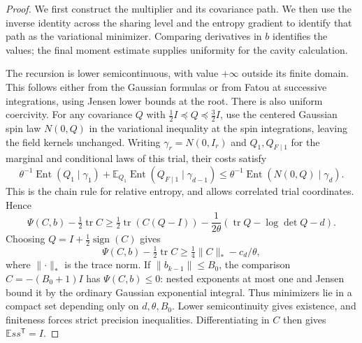 \documentclass[11pt]{article}
\numberwithin{equation}{section}
\theoremstyle{definition}
\newcommand{\E}{\mathbb E}
\newcommand{\tr}{\operatorname{tr}}
\newcommand{\norm}[1]{\lVert #1\rVert}
\begin{document}
\begin{proof}
We first construct the multiplier and its covariance path. We then use the inverse identity across the sharing level and the entropy gradient to identify that path as the variational minimizer. Comparing derivatives in $b$ identifies the values; the final moment estimate supplies uniformity for the cavity calculation.

The recursion is lower semicontinuous, with value $+\infty$ outside its finite domain. This follows either from the Gaussian formulas or from Fatou at successive integrations, using Jensen lower bounds at the root. There is also uniform coercivity. For any covariance $Q$ with $\frac12I\preceq Q\preceq\frac32I$, use the centered Gaussian spin law $N(0,Q)$ in the variational inequality at the spin integrations, leaving the field kernels unchanged. Writing $\gamma_r=N(0,I_r)$ and $Q_1,Q_{F\mid1}$ for the marginal and conditional laws of this trial, their costs satisfy
\[
\theta^{-1}\operatorname{Ent}(Q_1\mid\gamma_1)
+\E_{Q_1}\operatorname{Ent}(Q_{F\mid1}\mid\gamma_{d-1})
\le\theta^{-1}\operatorname{Ent}(N(0,Q)\mid\gamma_d).
\]
This is the chain rule for relative entropy, and allows correlated trial coordinates. Hence
\[
\Psi(C,b)-\tfrac12\tr C
\ge\tfrac12\tr(C(Q-I))-
\frac1{2\theta}(\tr Q-\log\det Q-d).
\]
Choosing $Q=I+\frac12\operatorname{sign}(C)$ gives
\begin{equation}\label{eq:coercivity}
\Psi(C,b)-\tfrac12\tr C\ge\tfrac14\norm C_*-c_d/\theta,
\end{equation}
where $\norm\cdot_*$ is the trace norm. If $\norm{b_{k-1}}\le B_0$, the comparison $C=-(B_0+1)I$ has $\Psi(C,b)\le0$: nested exponents at most one and Jensen bound it by the ordinary Gaussian exponential integral. Thus minimizers lie in a compact set depending only on $d,\theta,B_0$. Lower semicontinuity gives existence, and finiteness forces strict precision inequalities. Differentiating in $C$ then gives $\E ss^{\mathsf T}=I$.


\end{proof}
\end{document}
